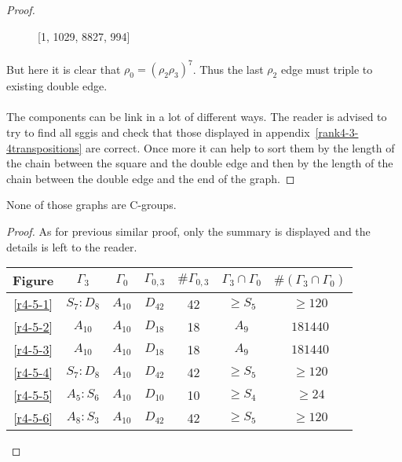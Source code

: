 \begin{proof}
\begin{figure}[H]
\begin{center}
\begin{tikzpicture}[scale=.8]
      \end{tikzpicture}
      \caption{[1, 1029, 8827, 994]}
    \end{center}
  \end{figure}

  \paragraph{}
  But here it is clear that $\rho_0 = (\rho_2 \rho_3)^7$. Thus the last $\rho_2$ edge must triple to existing double edge.

  \paragraph{}
  The components can be link in a lot of different ways. The reader is advised to try to find all sggis and check that those displayed in appendix~\ref{rank4-3-4transpositions} are correct. Once more it can help to sort them by the length of the chain between the square and the double edge and then by the length of the chain between the double edge and the end of the graph.

\end{proof}

\begin{theorem}
  None of those graphs are C-groups.
\end{theorem}

\begin{proof}
  As for previous similar proof, only the summary is displayed and the details is left to the reader.

  \begin{table}[H]
    \centering
    \begin{tabular}{|c|c|c|c|c|c|c|}
      \hline
      Figure & $\Gamma_3$ & $\Gamma_0$ & $\Gamma_{0,3}$ & $\#\Gamma_{0,3}$ & $\Gamma_3 \cap \Gamma_0$ & $\#(\Gamma_3 \cap \Gamma_0)$ \\ \hline

      \ref{r4-5-1} & $S_7 : D_8$ & $A_{10}$ & $D_{42}$ & 42 & $\ge S_5$ & $\ge 120$ \\ \hline
      \ref{r4-5-2} & $A_{10}$ & $A_{10}$ & $D_{18}$ & 18 & $A_9$ & $181440$ \\ \hline
      \ref{r4-5-3} & $A_{10}$ & $A_{10}$ & $D_{18}$ & 18 & $A_9$ & $181440$ \\ \hline
      \ref{r4-5-4} & $S_7 : D_8$ & $A_{10}$ & $D_{42}$ & 42 & $\ge S_5$ & $\ge 120$ \\ \hline
      \ref{r4-5-5} & $A_5 : S_6$ & $A_{10}$ & $D_{10}$ & 10 & $\ge S_4$ & $\ge 24$ \\ \hline
      \ref{r4-5-6} & $A_8 : S_3$ & $A_{10}$ & $D_{42}$ & 42 & $\ge S_5$ & $\ge 120$ \\ \hline

    \end{tabular}
  \end{table}
\end{proof}
